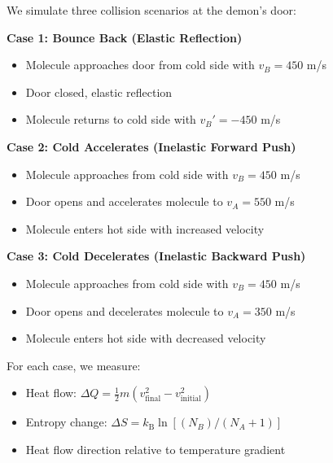 \documentclass[10pt,twocolumn,letterpaper]{article}
\theoremstyle{definition}
\theoremstyle{remark}
\newcommand{\kb}{k_\text{B}}
\begin{document}
We simulate three collision scenarios at the demon's door:

\textbf{Case 1: Bounce Back (Elastic Reflection)}
\begin{itemize}
\item Molecule approaches door from cold side with $v_B = 450$ m/s
\item Door closed, elastic reflection
\item Molecule returns to cold side with $v_B' = -450$ m/s
\end{itemize}

\textbf{Case 2: Cold Accelerates (Inelastic Forward Push)}
\begin{itemize}
\item Molecule approaches from cold side with $v_B = 450$ m/s
\item Door opens and accelerates molecule to $v_A = 550$ m/s
\item Molecule enters hot side with increased velocity
\end{itemize}

\textbf{Case 3: Cold Decelerates (Inelastic Backward Push)}
\begin{itemize}
\item Molecule approaches from cold side with $v_B = 450$ m/s
\item Door opens and decelerates molecule to $v_A = 350$ m/s
\item Molecule enters hot side with decreased velocity
\end{itemize}

For each case, we measure:
\begin{itemize}
\item Heat flow: $\Delta Q = \frac{1}{2}m(v_{\text{final}}^2 - v_{\text{initial}}^2)$
\item Entropy change: $\Delta S = \kb \ln[(N_B)/(N_A+1)]$
\item Heat flow direction relative to temperature gradient
\end{itemize}
\end{document}
